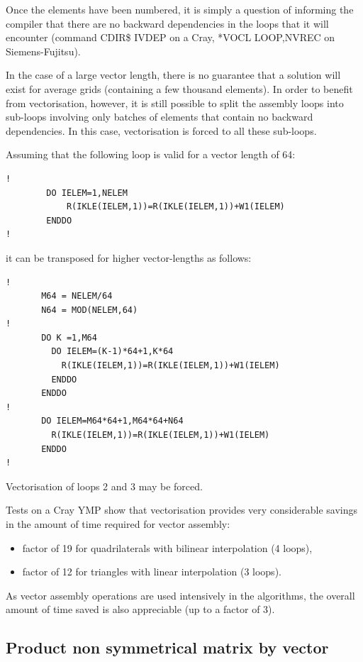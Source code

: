 Once the elements have been numbered, it is simply a question of informing the
compiler that there are no backward dependencies in the loops that it will
encounter (command CDIR\$ IVDEP on a Cray, *VOCL LOOP,NVREC on
Siemens-Fujitsu).

In the case of a large vector length, there is no guarantee that a solution
will exist for average grids (containing a few thousand elements). In order to
benefit from vectorisation, however, it is still possible to split the assembly
loops into sub-loops involving only batches of elements that contain no
backward dependencies. In this case, vectorisation is forced to all these
sub-loops.

Assuming that the following loop is valid for a vector length of 64:

\begin{lstlisting}[language=TelFortran]
!
        DO IELEM=1,NELEM
            R(IKLE(IELEM,1))=R(IKLE(IELEM,1))+W1(IELEM)
        ENDDO
!
\end{lstlisting}

it can be transposed for higher vector-lengths as follows:
\begin{lstlisting}[language=TelFortran]
!
       M64 = NELEM/64
       N64 = MOD(NELEM,64)
!
       DO K =1,M64
         DO IELEM=(K-1)*64+1,K*64
           R(IKLE(IELEM,1))=R(IKLE(IELEM,1))+W1(IELEM)
         ENDDO
       ENDDO
!
       DO IELEM=M64*64+1,M64*64+N64
         R(IKLE(IELEM,1))=R(IKLE(IELEM,1))+W1(IELEM)
       ENDDO
!
\end{lstlisting}

Vectorisation of loops 2 and 3 may be forced.

Tests on a Cray YMP show that vectorisation provides very considerable savings
in the amount of time required for vector assembly:
\begin{itemize}
  \item factor of 19 for quadrilaterals with bilinear interpolation (4 loops),
  \item factor of 12 for triangles with linear interpolation (3 loops).
\end{itemize}

As vector assembly operations are used intensively in the algorithms, the
overall amount of time saved is also appreciable (up to a factor of 3).

\subsection{Product non symmetrical matrix by vector}

